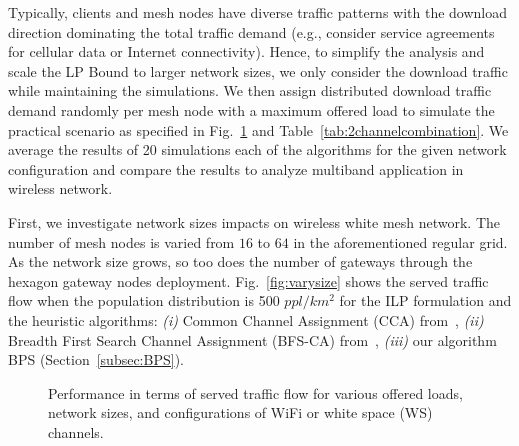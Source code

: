 Typically, clients and mesh nodes have diverse traffic patterns with
the download direction dominating the total traffic demand (e.g., consider
service agreements for cellular data or Internet connectivity). Hence, to
simplify the analysis and scale the LP Bound to larger network sizes, we 
only consider the download traffic while maintaining the simulations.
We then assign distributed download traffic demand randomly per 
mesh node with a maximum offered load to simulate the practical scenario 
as specified in Fig.~\ref{fig:all3figs} and Table~\ref{tab:2channelcombination}. 
We average the results of 20 simulations each of the algorithms for the 
given network configuration and compare the results to analyze multiband 
application in wireless network.

First, we investigate network sizes impacts on wireless white mesh network. 
The number of mesh nodes is varied from $16$ to $64$ in the aforementioned 
regular grid. As the network size grows, so too does the number of gateways
through the hexagon gateway nodes deployment. 
Fig.~\ref{fig:varysize} shows the served traffic flow when the 
population distribution is 500 $ppl/km^2$ for the ILP formulation and 
the heuristic algorithms: 
{\it (i)} Common Channel Assignment (CCA) from~\cite{draves2004routing},
{\it (ii)} Breadth First Search Channel Assignment (BFS-CA) from~\cite{ramachandran2006interference},
{\it (iii)} our algorithm BPS (Section~\ref{subsec:BPS}).


\begin{figure}[t]
\centering
{}
\hfill
\caption{Performance in terms of served traffic flow for various offered loads, network sizes, and configurations of WiFi or white space (WS) channels.}
\label{fig:all3figs}
\vspace{-0.1in}
\end{figure}

